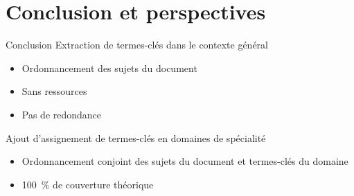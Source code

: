 \section{Conclusion et perspectives}
  \begin{frame}{Conclusion}
    Extraction de termes-clés dans le contexte général
    \begin{itemize}
      \item{Ordonnancement des sujets du document}
      \item{Sans ressources}
      \item{Pas de redondance}
    \end{itemize}

    \vspace{1em}

    Ajout d'assignement de termes-clés en domaines de spécialité
    \begin{itemize}
      \item{Ordonnancement conjoint des sujets du document et termes-clés du
            domaine}
      \item{100~\% de couverture théorique}
    \end{itemize}
  \end{frame}

